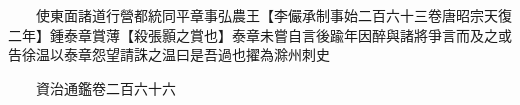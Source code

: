 　　使東面諸道行營都統同平章事弘農王【李儼承制事始二百六十三卷唐昭宗天復二年】鍾泰章賞薄【殺張顥之賞也】泰章未嘗自言後踰年因醉與諸將爭言而及之或告徐温以泰章怨望請誅之温曰是吾過也擢為滁州刺史

　　資治通鑑卷二百六十六


    


 


 



 

 
  







 


　　
　　
　
　
　


　　

　















	
	









































 
  



















 





 












  
  
  

 





